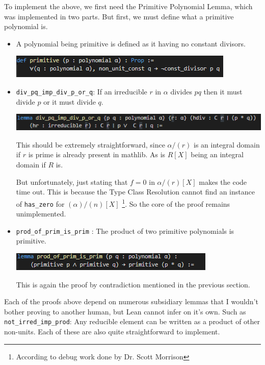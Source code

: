 \documentclass[pagesize=a4]{scrreprt}
\begin{document}
To implement the above, we first need the Primitive Polynomial Lemma, which was implemented in two parts. But first, we must define what a primitive polynomial is.  

\begin{itemize}
   \item A polynomial being primitive is defined as it having no constant divisors. 

   \includegraphics{def_prim.png}

   \item \texttt{div\_pq\_imp\_div\_p\_or\_q}: If an irreducible $r$ in $\alpha$ divides $pq$ then it must divide $p$ or it must divide $q$. 

    \includegraphics{div_pq.png}

    This should be extremely straightforward, since $\alpha/(r)$ is an integral domain if $r$ is prime is already present in mathlib. As is $R[X]$ being an integral domain if $R$ is.

    But unfortunately, just stating that $f = 0$ in $\alpha/(r)[X]$ makes the code time out. This is because the Type Class Resolution cannot find an instance of \texttt{has\_zero} for $(\alpha)/(n)[X]$ \footnote{According to debug work done by Dr. Scott Morrison}. So the core of the proof remains unimplemented.

    \item \texttt{prod\_of\_prim\_is\_prim} : The product of two primitive polynomials is primitive. 
    
    \includegraphics{prod_prim.png} 

    This is again the proof by contradiction mentioned in the previous section. 

\end{itemize}


Each of the proofs above depend on numerous subsidiary lemmas that I wouldn't bother proving to another human, but Lean cannot infer on it's own. Such as \texttt{not\_irred\_imp\_prod}: Any reducible element can be written as a product of other non-units. Each of these are also quite straightforward to implement. 
\end{document}
